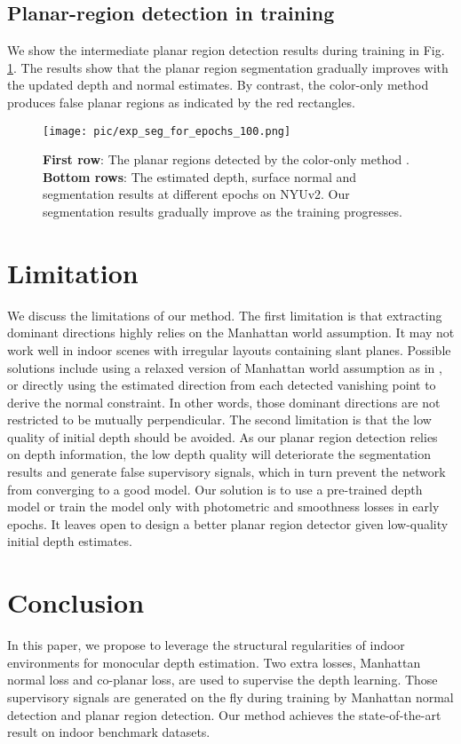 \documentclass[10pt,twocolumn,letterpaper]{article}
\newcommand{\Fig}[1]{Fig. \ref{#1}}
\begin{document}
\subsection{Planar-region detection in training}
We show the intermediate planar region detection results during training in \Fig{Fig:seg trainning}. 
The results show that the planar region segmentation gradually improves with the updated depth and normal estimates. 
By contrast, the color-only method produces false planar regions as indicated by the red rectangles.
\begin{figure}                              
	\centering                    
	\texttt{[image: pic/exp\_seg\_for\_epochs\_100.png]}	\caption{\textbf{First row}: The planar regions detected by the color-only method \cite{yu2020p}. 
		\textbf{Bottom rows}: The estimated depth, surface normal and segmentation results at different epochs on NYUv2. Our segmentation results gradually improve as the training progresses.}
	\label{Fig:seg trainning}
\end{figure}

\section{Limitation}
We discuss the limitations of our method. The first limitation is that extracting dominant directions highly relies on the Manhattan world assumption. It may not work well in indoor scenes with irregular layouts containing slant planes. Possible solutions include using a relaxed version of Manhattan world assumption as in \cite{schindler2004atlanta}\cite{zou2019structvio}, or directly using the estimated direction from each detected vanishing point to derive the normal constraint. In other words, those dominant directions are not restricted to be mutually perpendicular.
The second limitation is that the low quality of initial depth should be avoided. As our planar region detection relies on depth information, the low depth quality will deteriorate the segmentation results and generate false supervisory signals, which in turn prevent the network from converging to a good model. Our solution is to use a pre-trained depth model or train the model only with photometric and smoothness losses in early epochs. It leaves open to design a better planar region detector given low-quality initial depth estimates.


\section{Conclusion}
In this paper, we propose to leverage the structural regularities of indoor environments for monocular depth estimation. Two extra losses, Manhattan normal loss and co-planar loss, are used to supervise the depth learning. Those supervisory signals are generated on the fly during training by Manhattan normal detection and planar region detection. Our method achieves the state-of-the-art result on indoor benchmark datasets.
\end{document}
